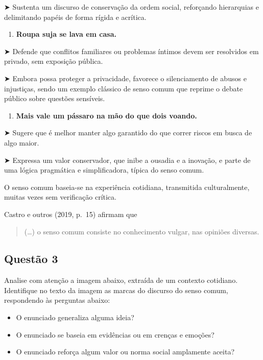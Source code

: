 \documentclass[
]{book}
\providecommand{\tightlist}{%
  \setlength{\itemsep}{0pt}\setlength{\parskip}{0pt}}
\begin{document}
➤ Sustenta um discurso de conservação da ordem social, reforçando hierarquias e delimitando papéis de forma rígida e acrítica.

\begin{enumerate}
\def\labelenumi{\arabic{enumi}.}
\setcounter{enumi}{3}
\tightlist
\item
  \textbf{Roupa suja se lava em casa.}
\end{enumerate}

➤ Defende que conflitos familiares ou problemas íntimos devem ser resolvidos em privado, sem exposição pública.

➤ Embora possa proteger a privacidade, favorece o silenciamento de abusos e injustiças, sendo um exemplo clássico de senso comum que reprime o debate público sobre questões sensíveis.

\begin{enumerate}
\def\labelenumi{\arabic{enumi}.}
\setcounter{enumi}{4}
\tightlist
\item
  \textbf{Mais vale um pássaro na mão do que dois voando.}
\end{enumerate}

➤ Sugere que é melhor manter algo garantido do que correr riscos em busca de algo maior.

➤ Expressa um valor conservador, que inibe a ousadia e a inovação, e parte de uma lógica pragmática e simplificadora, típica do senso comum.

O senso comum baseia-se na experiência cotidiana, transmitida culturalmente, muitas vezes sem verificação crítica.

Castro e outros (2019, p.~15) afirmam que

\begin{quote}
(\ldots) o senso comum consiste no conhecimento vulgar, nas opiniões diversas.
\end{quote}

\subsection{Questão 3}\label{questuxe3o-3-2}

Analise com atenção a imagem abaixo, extraída de um contexto cotidiano. Identifique no texto da imagem as marcas do discurso do senso comum, respondendo às perguntas abaixo:

\begin{itemize}
\item
  O enunciado generaliza alguma ideia?
\item
  O enunciado se baseia em evidências ou em crenças e emoções?
\item
  O enunciado reforça algum valor ou norma social amplamente aceita?
\end{itemize}
\end{document}
